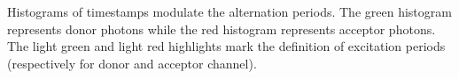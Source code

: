 \label{fig:altern_hist}
Histograms of timestamps modulate the alternation periods. The green histogram represents
donor photons while the red histogram represents acceptor photons. The light green and
light red highlights mark the definition of excitation periods (respectively
for donor and acceptor channel). 
